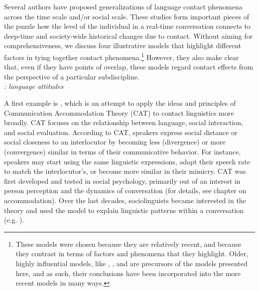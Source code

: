  Several authors have proposed generalizations of language contact phenomena across the time scale and/or social scale. These studies form important pieces of the puzzle how the level of the individual in a real-time conversation connects to deep-time and society-wide historical changes due to contact. Without aiming for comprehensiveness, we discuss four illustrative models that highlight different factors in tying together contact phenomena.\footnote{These models were chosen because they are relatively recent, and because they contrast in terms of factors and phenomena that they highlight. Older, highly influential models, like \cite{Weinreich1953Languages}, \cite{thomasonetal1988language}, and \cite{van_coetsem_loan_1988} are precursors of the models presented here, and as such, their conclusions have been incorporated into the more recent models in many ways.} However, they also make clear that, even if they have points of overlap, these models regard contact effects from the perspective of a particular subdiscipline.\\
 
 \noindent
 \emph{\cite{niedzielskietal1996linguistic}: language attitudes}
 
\noindent A first example is \cite{niedzielskietal1996linguistic}, which is an attempt to apply the ideas and principles of Communication Accommodation Theory (CAT) to contact linguistics more broadly. CAT focuses on the relationship between language, social interaction, and social evaluation. According to CAT, speakers express social distance or social closeness to an interlocutor by becoming less (divergence) or more (convergence) similar in terms of their communicative behavior. For instance, speakers may start using the same linguistic expressions, adapt their speech rate to match the interlocutor's, or become more similar in their mimicry.
 CAT was first developed and tested in social psychology, primarily out of an interest in person perception and the dynamics of conversation (for details, see chapter on accommodation). 
 Over the last decades, sociolinguists became interested in the theory and used the model to explain linguistic patterns within a conversation (e.g. \citealt{coupland_accommodation_1984}).
 
